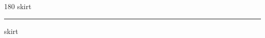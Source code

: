 
\begin{frame}
\begin{center}
\begin{turn}{180}
{\fontsize{2.5cm}{1em}\selectfont skirt}
\end{turn}
\vspace{1em}\par  
\hrule
\vspace{1em}\par  
{\fontsize{2.5cm}{1em}\selectfont skirt}
\end{center}
\end{frame}
